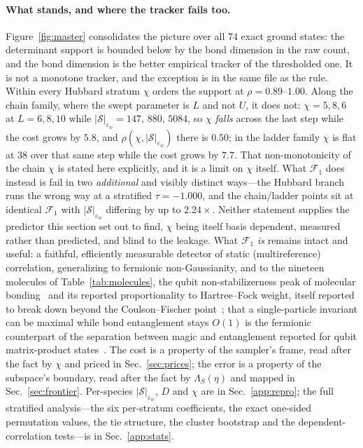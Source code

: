 \paragraph{What stands, and where the tracker fails too.} Figure~\ref{fig:master} consolidates the
picture over all $74$ exact ground states: the determinant support is bounded below by the bond
dimension in the raw count, and the bond dimension is the better empirical tracker of the thresholded
one. It is not a monotone tracker, and the exception is in the same file as the rule. Within every
Hubbard stratum $\chi$ orders the support at $\rho=0.89$--$1.00$. Along the chain family, where the
swept parameter is $L$ and not $U$, it does not: $\chi=5,8,6$ at $L=6,8,10$ while
$|\mathcal S|_{\varepsilon_w}=147,\,880,\,5084$, so $\chi$ \emph{falls} across the last step while the
cost grows by $5.8$, and $\rho(\chi,|\mathcal S|_{\varepsilon_w})$ there is $0.50$; in the ladder family
$\chi$ is flat at $38$ over that same step while the cost grows by $7.7$. That non-monotonicity of the
chain $\chi$ is stated here explicitly, and it is a limit on $\chi$ itself. What
$\mathcal F_1$ does instead is fail in two \emph{additional} and visibly distinct ways---the Hubbard
branch runs the wrong way at a stratified $\tau=-1.000$, and the chain/ladder points sit at identical
$\mathcal F_1$ with $|\mathcal S|_{\varepsilon_w}$ differing by up to $2.24\times$. Neither statement supplies the
predictor this section set out to find, $\chi$ being itself basis dependent, measured rather than
predicted, and blind to the leakage. What $\mathcal F_1$ \emph{is} remains intact and useful: a faithful,
efficiently measurable detector of static (multireference) correlation, generalizing to fermionic
non-Gaussianity, and to the nineteen molecules of Table~\ref{tab:molecules}, the qubit non-stabilizerness
peak of molecular bonding~\cite{sarkis2025} and its reported proportionality to Hartree--Fock weight,
itself reported to break down beyond the Coulson--Fischer point~\cite{seibert2026}; that a single-particle
invariant can be maximal while bond entanglement stays $O(1)$ is the fermionic counterpart of the
separation between magic and entanglement reported for qubit matrix-product
states~\cite{frautarabunga2024}. The cost is a
property of the sampler's frame, read after the fact by $\chi$ and priced in Sec.~\ref{sec:prices}; the
error is a property of the subspace's boundary, read after the fact by $\Lambda_S(\eta)$ and mapped in
Sec.~\ref{sec:frontier}. Per-species $|\mathcal S|_{\varepsilon_w}$, $D$ and $\chi$ are in
Sec.~\ref{app:repro}; the full stratified analysis---the six per-stratum coefficients, the exact
one-sided permutation values, the tie structure, the cluster bootstrap and the dependent-correlation
tests---is in Sec.~\ref{app:stats}.

